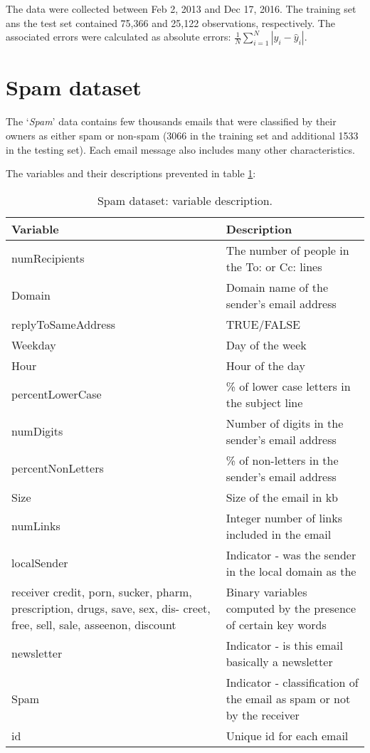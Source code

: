 \documentclass{article}
\begin{document}
The data were collected between Feb 2, 2013 and Dec 17, 2016. The training set ans the test set contained 75,366 and 25,122 observations, respectively.  
The associated errors were calculated as absolute errors: $\frac{1}{N} \sum_{i=1}^{N} |y_i - \hat{y}_i|$. 






\section{Spam dataset}
The `\textit{Spam}' data contains few thousands emails that were classified by their
owners as either spam or non-spam (3066 in the training set and additional 1533 in the testing set). Each email message also includes many other characteristics.

The variables and their descriptions prevented in table \ref{tab:spam_var}:

\begin{table}[h]
	\begin{center}
		\renewcommand{\arraystretch}{1.2}
		\begin{tabular}{p{4cm} l} \hline
		Variable   				& Description       \\\hline
		numRecipients		    & The number of people in the To: or Cc: lines\\
		Domain      		    & Domain name of the sender's email address\\
		replyToSameAddress      & TRUE/FALSE\\
		Weekday 				& Day of the week\\
		Hour 					& Hour of the day\\
		percentLowerCase 		& \% of lower case letters in the subject line\\
		numDigits 				& Number of digits in the sender's email address\\
		percentNonLetters 		& \% of non-letters in the sender's email address\\
		Size 					& Size of the email in kb\\
		numLinks				& Integer number of links included in the email\\
		localSender 			& Indicator - was the sender in the local domain as the\\
		receiver
		credit, porn, sucker,
		pharm, prescription,
		drugs, save, sex, dis-
		creet, free, sell, sale,
		asseenon, discount		& Binary variables computed by the presence of
		certain key words \\
		newsletter 				& Indicator - is this email basically a newsletter\\
		Spam 					& Indicator - classification of the email as spam or not by the receiver\\
		id 						& Unique id for each email \\\hline
			
		\end{tabular}
		\caption{Spam dataset: variable description.}
	\end{center}
	\label{tab:spam_var}
\end{table} 
\end{document}
